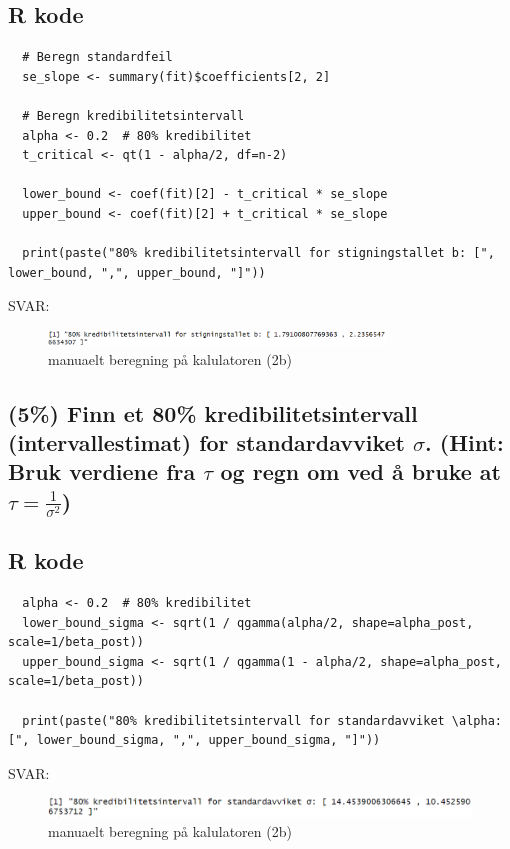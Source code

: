 \documentclass[12pt]{article}
\begin{document}
\subsection{R kode}
\begin{verbatim}
  # Beregn standardfeil
  se_slope <- summary(fit)$coefficients[2, 2]
  
  # Beregn kredibilitetsintervall
  alpha <- 0.2  # 80% kredibilitet
  t_critical <- qt(1 - alpha/2, df=n-2)
  
  lower_bound <- coef(fit)[2] - t_critical * se_slope
  upper_bound <- coef(fit)[2] + t_critical * se_slope
  
  print(paste("80% kredibilitetsintervall for stigningstallet b: [", lower_bound, ",", upper_bound, "]"))
\end{verbatim} 
SVAR:
\begin{figure}[H]
  \centering
  \includegraphics[width=0.8\textwidth]{3c.png}
  \caption{manuaelt beregning på kalulatoren (2b)}
\end{figure}



\subsection{(5\%) Finn et 80\% kredibilitetsintervall (intervallestimat) for standardavviket $\sigma$. (Hint: Bruk verdiene fra $\tau$ og regn om ved å bruke at $\tau = \frac{1}{\sigma^2}$)}
\subsection{R kode}
\begin{verbatim}
  alpha <- 0.2  # 80% kredibilitet
  lower_bound_sigma <- sqrt(1 / qgamma(alpha/2, shape=alpha_post, scale=1/beta_post))
  upper_bound_sigma <- sqrt(1 / qgamma(1 - alpha/2, shape=alpha_post, scale=1/beta_post))
  
  print(paste("80% kredibilitetsintervall for standardavviket \alpha: [", lower_bound_sigma, ",", upper_bound_sigma, "]"))  
\end{verbatim} 
SVAR:

\begin{figure}[H]
  \centering
  \includegraphics[width=1\textwidth]{3d.png}
  \caption{manuaelt beregning på kalulatoren (2b)}
\end{figure}
\end{document}
